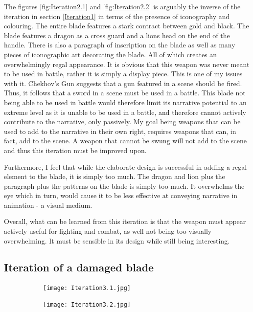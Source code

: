 \documentclass{article}
\begin{document}
The figures \ref{fig:Iteration2.1} and \ref{fig:Iteration2.2} is arguably the inverse of the iteration in section \ref{Iteration1} in terms of the presence of iconography and colouring. The entire blade features a stark contract between gold and black. The blade features a dragon as a cross guard and a lions head on the end of the handle. There is also a paragraph of inscription on the blade as well as many pieces of iconographic art decorating the blade. All of which creates an overwhelmingly regal appearance. It is obvious that this weapon was never meant to be used in battle, rather it is simply a display piece. This is one of my issues with it. Chekhov's Gun \parencite{delaney1990chekhov} suggests that a gun featured in a scene should be fired. Thus, it follows that a sword in a scene must be used in a battle. This blade not being able to be used in battle would therefore limit its narrative potential to an extreme level as it is unable to be used in a battle, and therefore cannot actively contribute to the narrative, only passively. My goal being weapons that can be used to add to the narrative in their own right, requires weapons that can, in fact, add to the scene. A weapon that cannot be swung will not add to the scene and thus this iteration must be improved upon.

Furthermore, I feel that while the elaborate design is successful in adding a regal element to the blade, it is simply too much. The dragon and lion plus the paragraph plus the patterns on the blade is simply too much. It overwhelms the eye which in turn, would cause it to be less effective at conveying narrative in animation - a visual medium.

Overall, what can be learned from this iteration is that the weapon must appear actively useful for fighting and combat, as well not being too visually overwhelming. It must be sensible in its design while still being interesting.

\pagebreak

\subsection{Iteration of a damaged blade} \label{Iteration3}

\begin{figure}[h]
    \centering
    \caption{}
    \label{fig:Iteration3}
    \begin{subfigure}{0.49\textwidth}
        \texttt{[image: Iteration3.1.jpg]}
        \caption{}
        \label{fig:Iteration3.1}
    \end{subfigure}
    \begin{subfigure}{0.49\textwidth}
        \texttt{[image: Iteration3.2.jpg]}
        \caption{}
        \label{fig:Iteration3.2}
    \end{subfigure}
\end{figure}
\end{document}
